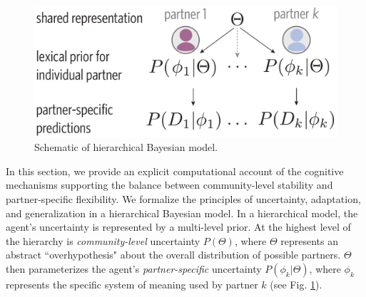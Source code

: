 
\begin{figure}[t!]
\includegraphics[scale=0.4]{./figures/task1_model.pdf}
\caption{Schematic of hierarchical Bayesian model.}
\label{fig:model_schematic}
\end{figure}

In this section, we provide an explicit computational account of the cognitive mechanisms supporting the balance between community-level stability and partner-specific flexibility.
%
We formalize the principles of uncertainty, adaptation, and generalization in a hierarchical Bayesian model.
In a hierarchical model, the agent's uncertainty is represented by a multi-level prior. 
At the highest level of the hierarchy is \emph{community-level} uncertainty $P(\Theta)$, where $\Theta$ represents an abstract ``overhypothesis" about the overall distribution of possible partners. 
$\Theta$ then parameterizes the agent's \emph{partner-specific} uncertainty $P(\phi_{k} | \Theta)$, where $\phi_k$ represents the specific system of meaning used by partner $k$ (see Fig. \ref{fig:model_schematic}). 

